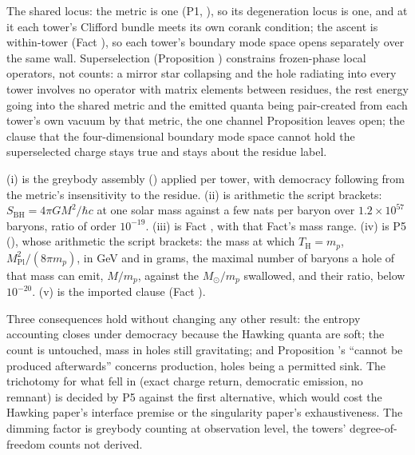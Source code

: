 The shared locus: the metric is one (P1, ), so its degeneration locus is one, and at it each tower's Clifford bundle meets its own corank condition; the ascent is within-tower (Fact ), so each tower's boundary mode space opens separately over the same wall. Superselection (Proposition ) constrains frozen-phase local operators, not counts: a mirror star collapsing and the hole radiating into every tower involves no operator with matrix elements between residues, the rest energy going into the shared metric and the emitted quanta being pair-created from each tower's own vacuum by that metric, the one channel Proposition  leaves open; the clause that the four-dimensional boundary mode space cannot hold the superselected charge stays true and stays about the residue label.

(i) is the greybody assembly () applied per tower, with democracy following from the metric's insensitivity to the residue. (ii) is arithmetic the script brackets: $S_{\mathrm{BH}} = 4\pi G M^{2}/\hbar c$ at one solar mass against a few nats per baryon over $1.2 \times 10^{57}$ baryons, ratio of order $10^{-19}$. (iii) is Fact , with that Fact's mass range. (iv) is P5 (), whose arithmetic the script brackets: the mass at which $T_{\mathrm{H}} = m_{p}$, $M_{\mathrm{Pl}}^{2}/(8\pi m_{p})$, in GeV and in grams, the maximal number of baryons a hole of that mass can emit, $M/m_{p}$, against the $M_{\odot}/m_{p}$ swallowed, and their ratio, below $10^{-20}$. (v) is the imported clause (Fact ).

Three consequences hold without changing any other result: the entropy accounting closes under democracy because the Hawking quanta are soft; the count is untouched, mass in holes still gravitating; and Proposition 's ``cannot be produced afterwards'' concerns production, holes being a permitted sink. The trichotomy for what fell in (exact charge return, democratic emission, no remnant) is decided by P5 against the first alternative, which would cost the Hawking paper's interface premise or the singularity paper's exhaustiveness. The dimming factor is greybody counting at observation level, the towers' degree-of-freedom counts not derived.
